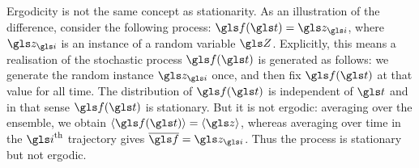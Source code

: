 
Ergodicity is not the same concept as stationarity. As an illustration of the difference, consider the following process: $\gf(\t)=\z_{\gi}$, where $\z_{\gi}$ is an instance of a random variable $\Z$. Explicitly, this means a realisation of the stochastic process $\gf(\t)$ is generated as follows: we generate the random instance $\z_{\gi}$ once, and then fix $\gf(\t)$ at that value for all time. The distribution of $\gf(\t)$ is independent of $\t$ and in that sense $\gf(\t)$ is stationary. But it is not ergodic: averaging over the ensemble, we obtain $\ave{\gf(\t)}=\ave{\z}$, whereas averaging over time in the $\gi^{\text{th}}$ trajectory gives $\overline{\gf}=\z_{\gi}$. Thus the process is stationary but not ergodic.

